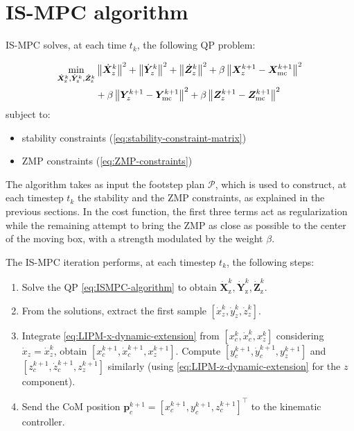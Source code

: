 \section{IS-MPC algorithm}
IS-MPC solves, at each time $t_k$, the following QP problem:
\begin{braced}
\begin{equation}
\begin{split}
\min_{\dot{\bm{X}}_\text{z}^k, \dot{\bm{Y}}_\text{z}^k, \dot{\bm{Z}}_\text{z}^k}
&\left\|\dot{\bm{X}}_z^k\right\|^2 + \left\|\dot{\bm{Y}}_z^k\right\|^2 + \left\|\dot{\bm{Z}}_z^k\right\|^2+\beta \left\|\bm{X}_z^{k+1} - {\bm{X}}_{\rm mc}^{k+1}\right\|^2 \\& + \beta \left\|\bm{Y}_z^{k+1} - {\bm{Y}}_{\rm mc}^{k+1}\right\|^2 + \beta \left\|\bm{Z}_z^{k+1} - {\bm{Z}}_{\rm mc}^{k+1}\right\|^2 \\
\end{split}
\label{eq:ISMPC-algorithm}
\end{equation}
\hspace{0.25cm} subject to:
\begin{itemize}
    \item stability constraints (\ref{eq:stability-constraint-matrix})
    \item ZMP constraints (\ref{eq:ZMP-constraints})
\end{itemize}
\end{braced}

The algorithm takes as input the footstep plan $\mathcal{P}$, which is used
to construct, at each timestep $t_k$ the stability and the ZMP constraints,
as explained in the previous sections.
In the cost function, the first three terms act as regularization while the
remaining attempt to bring the ZMP as close as possible to the center of the
moving box, with a strength modulated by the weight $\beta$.

The IS-MPC iteration performs, at each timestep $t_k$, the following steps:
\begin{enumerate}
    \item Solve the QP \eqref{eq:ISMPC-algorithm} to obtain 
        $\dot{\bm{X}}_\text{z}^k, \dot{\bm{Y}}_\text{z}^k, \dot{\bm{Z}}_\text{z}^k$.
    \item From the solutions, extract the first sample $\left[\dot x_z^k, \dot y_z^k, \dot z_z^k\right]$.
    \item Integrate \eqref{eq:LIPM-x-dynamic-extension} from
        $\left[x_c^k, \dot{x}_c^k, x_z^k\right]$ considering $\dot{x}_z=\dot{x}_z^k$, obtain
        $\left[x_c^{k+1}, \dot{x}_c^{k+1}, x_z^{k+1}\right]$.
        Compute $\left[y_c^{k+1}, \dot{y}_c^{k+1}, y_z^{k+1}\right]$ and 
        $\left[z_c^{k+1}, \dot{z}_c^{k+1}, z_z^{k+1}\right]$ similarly (using
        \eqref{eq:LIPM-z-dynamic-extension} for the $z$ component).
    \item Send the CoM position $\bm{p}_c^{k+1}=\left[x_c^{k+1}, y_c^{k+1}, z_c^{k+1}\right]^\top$
        to the kinematic controller.
\end{enumerate}

